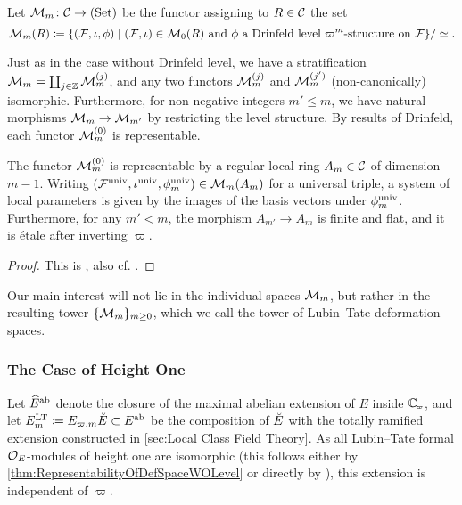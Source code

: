 \documentclass[../main.tex]{subfiles}
\begin{document}
\begin{defi}\label{def:LTDefSpaceWithLevel}
  Let $\mathcal{M}_m\colon \mathcal{C} \to {(\mathrm{Set})}$ be the functor assigning to $R \in \mathcal{C}$ the set 
  \begin{equation*}
    \mathcal{M}_m(R) \coloneqq \{(\mathcal{F}, \iota, \phi) \mid (\mathcal{F}, \iota) \in \mathcal{M}_0(R) \text{ and }\phi
    \text{ a Drinfeld level $\varpi^m$-structure on $\mathcal{F}$}\}/\simeq.
  \end{equation*}
\end{defi}

Just as in the case without Drinfeld level, we have a stratification $\mathcal{M}_m =
\coprod_{j \in \mathbb{Z}} \mathcal{M}_m^{(j)}$, and any two functors $\mathcal{M}_m^{(j)}$ and
$\mathcal{M}_m^{(j')}$ (non-canonically) isomorphic.
Furthermore, for non-negative integers $m' \leq m$, we have natural morphisms
$\mathcal{M}_m \to \mathcal{M}_{m'}$ by restricting the level structure. 
By results of Drinfeld, each functor $\mathcal{M}_m^{(0)}$ is representable.

\begin{thm}\label{thm:RepresentabilityOfDefSpaceWithLevel}
  The functor $\mathcal{M}_m^{(0)}$ is representable by a regular local ring $A_m \in \mathcal{C}$ of 
  dimension $m-1$. Writing $(\mathcal{F}^{\mathrm{univ}}, \iota^{\mathrm{univ}}, \phi_m^{\mathrm{univ}}) \in \mathcal{M}_m(A_m)$ for
  a universal triple, a system of local parameters is given by the images of the 
  basis vectors under $\phi_m^{\mathrm{univ}}$. Furthermore, for any $m' < m$, the morphism 
  $A_{m'} \to A_m$ is finite and flat, and it is \'etale after inverting $\varpi$. 
\begin{proof}
  This is \cite[Proposition 4.3]{drinfel1974elliptic}, also cf.
  \cite[Proposition 2.2.5]{Strauch2008DefSp}.
\end{proof}
\end{thm}

Our main interest will not lie in the individual spaces $\mathcal{M}_m$, but rather in
the resulting tower $\{\mathcal{M}_m\}_{m \geq 0}$, which we call the tower of
Lubin--Tate deformation spaces.


\subsubsection{The Case of Height One} %
\label{ssub:The Case of Height One}
Let $\widehat E^{\mathrm{ab}}$ denote the closure of the maximal abelian extension of $E$ inside
$\Cp$, and let $E_m^{\mathrm{LT}} \coloneq E_{\varpi, m}{\breve {E}} \subset E^{\mathrm{ab}}$ be the composition
of ${\breve {E}}$ with the totally ramified extension constructed in \cref{sec:Local
Class Field Theory}. As all Lubin--Tate formal $\mathcal{O}_E$-modules of height one
are isomorphic (this follows either by \cref{thm:RepresentabilityOfDefSpaceWOLevel} 
or directly by \cite[Lemma 2]{LubinTateFormalMult}), this extension is independent
of $\varpi$. 
\end{document}
